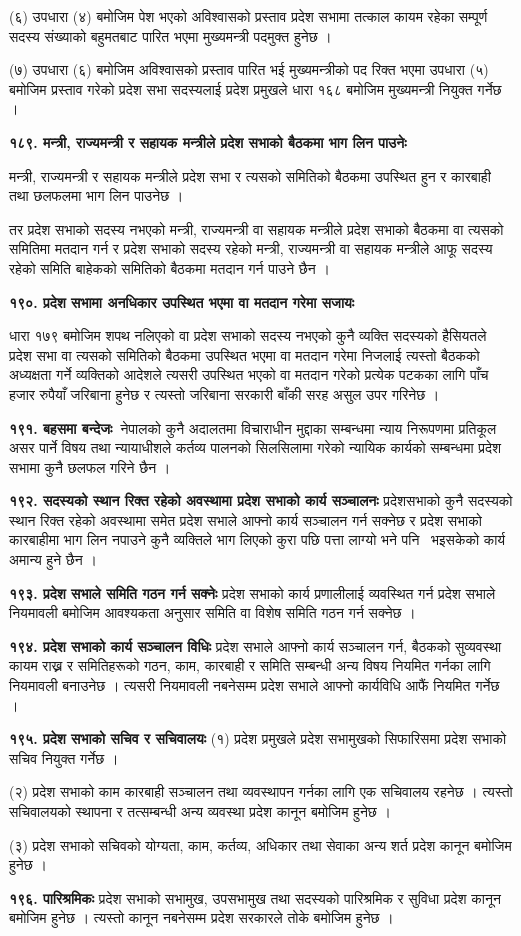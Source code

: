 (६) उपधारा (४) बमोजिम पेश भएको अविश्वासको प्रस्ताव प्रदेश सभामा तत्काल कायम रहेका सम्पूर्ण सदस्य संख्याको बहुमतबाट पारित
भएमा मुख्यमन्त्री पदमुक्त हुनेछ ।

(७) उपधारा (६) बमोजिम अविश्वासको प्रस्ताव पारित भई मुख्यमन्त्रीको पद रिक्त भएमा उपधारा (५) बमोजिम प्रस्ताव गरेको प्रदेश सभा सदस्यलाई प्रदेश प्रमुखले धारा १६८ बमोजिम मुख्यमन्त्री नियुक्त गर्नेछ ।

\textbf{१८९. मन्त्री, राज्यमन्त्री र सहायक मन्त्रीले प्रदेश सभाको बैठकमा भाग लिन पाउनेः}

मन्त्री, राज्यमन्त्री र सहायक मन्त्रीले प्रदेश सभा र त्यसको समितिको बैठकमा उपस्थित हुन र कारबाही तथा छलफलमा भाग लिन
पाउनेछ ।

तर प्रदेश सभाको सदस्य नभएको मन्त्री, राज्यमन्त्री वा सहायक मन्त्रीले प्रदेश सभाको बैठकमा वा त्यसको समितिमा मतदान गर्न र प्रदेश
सभाको सदस्य रहेको मन्त्री, राज्यमन्त्री वा सहायक मन्त्रीले आफू सदस्य रहेको समिति बाहेकको समितिको बैठकमा मतदान गर्न पाउने छैन ।

\textbf{१९०. प्रदेश सभामा अनधिकार उपस्थित भएमा वा मतदान गरेमा सजायः}

धारा १७९ बमोजिम शपथ नलिएको वा प्रदेश सभाको सदस्य नभएको कुनै व्यक्ति सदस्यको हैसियतले प्रदेश सभा वा त्यसको समितिको बैठकमा उपस्थित भएमा वा मतदान गरेमा निजलाई त्यस्तो बैठकको अध्यक्षता गर्ने व्यक्तिको आदेशले त्यसरी उपस्थित भएको वा मतदान गरेको प्रत्येक पटकका लागि पाँच हजार रुपैयाँ जरिबाना हुनेछ र त्यस्तो जरिबाना सरकारी बाँकी सरह असुल उपर गरिनेछ ।

\textbf{१९१. बहसमा बन्देजः }नेपालको कुनै अदालतमा विचाराधीन मुद्दाका सम्बन्धमा न्याय निरूपणमा प्रतिकूल असर पार्ने विषय तथा न्यायाधीशले कर्तव्य पालनको सिलसिलामा गरेको न्यायिक कार्यको सम्बन्धमा प्रदेश सभामा कुनै छलफल गरिने छैन ।

\textbf{१९२. सदस्यको स्थान रिक्त रहेको अवस्थामा प्रदेश सभाको कार्य सञ्चालनः} प्रदेशसभाको कुनै सदस्यको स्थान रिक्त रहेको अवस्थामा समेत प्रदेश सभाले आफ्नो कार्य सञ्चालन गर्न सक्नेछ र प्रदेश सभाको कारबाहीमा भाग लिन नपाउने कुनै व्यक्तिले भाग लिएको कुरा पछि पत्ता लाग्यो भने पनि  भइसकेको कार्य अमान्य हुने छैन ।

\textbf{१९३. प्रदेश सभाले समिति गठन गर्न सक्नेः} प्रदेश सभाको कार्य प्रणालीलाई व्यवस्थित गर्न प्रदेश सभाले नियमावली बमोजिम आवश्यकता अनुसार समिति वा विशेष समिति गठन गर्न सक्नेछ ।

\textbf{१९४. प्रदेश सभाको कार्य सञ्चालन विधिः} प्रदेश सभाले आफ्नो कार्य सञ्चालन गर्न, बैठकको सुव्यवस्था कायम राख्न र समितिहरूको गठन, काम, कारबाही र समिति सम्बन्धी अन्य विषय नियमित गर्नका लागि नियमावली बनाउनेछ । त्यसरी नियमावली नबनेसम्म प्रदेश सभाले आफ्नो कार्यविधि आफैं नियमित गर्नेछ ।

\textbf{१९५. प्रदेश सभाको सचिव र सचिवालयः} (१) प्रदेश प्रमुखले प्रदेश सभामुखको सिफारिसमा प्रदेश सभाको सचिव नियुक्त गर्नेछ ।

(२) प्रदेश सभाको काम कारबाही सञ्चालन तथा व्यवस्थापन गर्नका लागि एक सचिवालय रहनेछ । त्यस्तो सचिवालयको स्थापना र तत्सम्बन्धी अन्य व्यवस्था प्रदेश कानून बमोजिम हुनेछ ।

(३) प्रदेश सभाको सचिवको योग्यता, काम, कर्तव्य, अधिकार तथा सेवाका अन्य शर्त प्रदेश कानून बमोजिम हुनेछ ।

\textbf{१९६. पारिश्रमिकः} प्रदेश सभाको सभामुख, उपसभामुख तथा सदस्यको पारिश्रमिक र सुविधा प्रदेश कानून बमोजिम हुनेछ । त्यस्तो कानून नबनेसम्म प्रदेश सरकारले तोके बमोजिम हुनेछ ।
